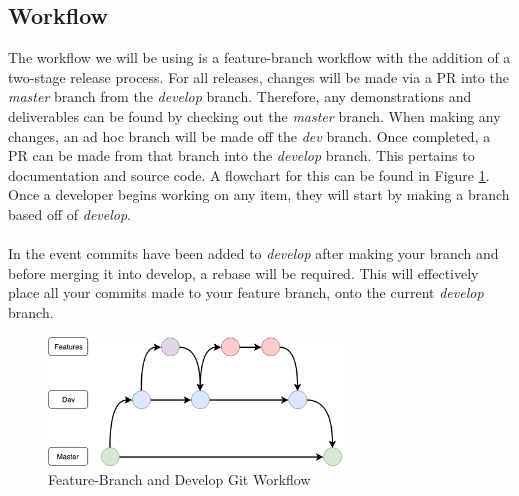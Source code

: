 \documentclass[11pt]{article}
\begin{document}
\subsection{Workflow}
The workflow we will be using is a feature-branch workflow with the addition of a two-stage release process. For all releases, changes will be made via a PR into the \textit{master} branch from the \textit{develop} branch. Therefore, any demonstrations and deliverables can be found by checking out the \textit{master} branch. When making any changes, an ad hoc branch will be made off the \textit{dev} branch. Once completed, a PR can be made from that branch into the \textit{develop} branch. This pertains to documentation and source code. A flowchart for this can be found in Figure \ref{fig:git}. Once a developer begins working on any item, they will start by making a branch based off of \textit{develop}. \\\\
In the event commits have been added to \textit{develop} after making your branch and before merging it into develop, a rebase will be required. This will effectively place all your commits made to your feature branch, onto the current \textit{develop} branch.
\begin{figure}[htbp]
   \centering
   \includegraphics[width=0.7\textwidth]{img/git.png} %
   \caption{Feature-Branch and Develop Git Workflow}
   \label{fig:git}
\end{figure}
\end{document}
